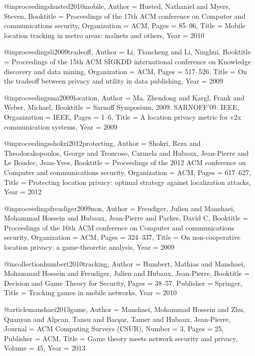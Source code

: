 {{{{{{{	@inproceedings{husted2010mobile,
	Author = {Husted, Nathaniel and Myers, Steven},
	Booktitle = {Proceedings of the 17th ACM conference on Computer and communications security},
	Organization = {ACM},
	Pages = {85--96},
	Title = {Mobile location tracking in metro areas: malnets and others},
	Year = {2010}}
	
	@inproceedings{li2009tradeoff,
	Author = {Li, Tiancheng and Li, Ninghui},
	Booktitle = {Proceedings of the 15th ACM SIGKDD international conference on Knowledge discovery and data mining},
	Organization = {ACM},
	Pages = {517--526},
	Title = {On the tradeoff between privacy and utility in data publishing},
	Year = {2009}}
	
	@inproceedings{ma2009location,
	Author = {Ma, Zhendong and Kargl, Frank and Weber, Michael},
	Booktitle = {Sarnoff Symposium, 2009. SARNOFF'09. IEEE},
	Organization = {IEEE},
	Pages = {1--6},
	Title = {A location privacy metric for v2x communication systems},
	Year = {2009}}
	
	@inproceedings{shokri2012protecting,
	Author = {Shokri, Reza and Theodorakopoulos, George and Troncoso, Carmela and Hubaux, Jean-Pierre and Le Boudec, Jean-Yves},
	Booktitle = {Proceedings of the 2012 ACM conference on Computer and communications security},
	Organization = {ACM},
	Pages = {617--627},
	Title = {Protecting location privacy: optimal strategy against localization attacks},
	Year = {2012}}
	
	@inproceedings{freudiger2009non,
	Author = {Freudiger, Julien and Manshaei, Mohammad Hossein and Hubaux, Jean-Pierre and Parkes, David C},
	Booktitle = {Proceedings of the 16th ACM conference on Computer and communications security},
	Organization = {ACM},
	Pages = {324--337},
	Title = {On non-cooperative location privacy: a game-theoretic analysis},
	Year = {2009}}
	
	@incollection{humbert2010tracking,
	Author = {Humbert, Mathias and Manshaei, Mohammad Hossein and Freudiger, Julien and Hubaux, Jean-Pierre},
	Booktitle = {Decision and Game Theory for Security},
	Pages = {38--57},
	Publisher = {Springer},
	Title = {Tracking games in mobile networks},
	Year = {2010}}
	
	@article{manshaei2013game,
	Author = {Manshaei, Mohammad Hossein and Zhu, Quanyan and Alpcan, Tansu and Bac{\c{s}}ar, Tamer and Hubaux, Jean-Pierre},
	Journal = {ACM Computing Surveys (CSUR)},
	Number = {3},
	Pages = {25},
	Publisher = {ACM},
	Title = {Game theory meets network security and privacy},
	Volume = {45},
	Year = {2013}}
	
}}}}}}}
